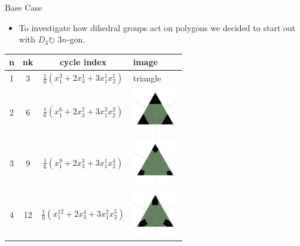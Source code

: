 \documentclass{beamer}
\begin{document}
\begin{frame}{Base Case}
	\begin{itemize}
    	\item To investigate how dihedral groups act on polygons we decided to start out with $D_3  				\circlearrowright$ $3n$-gon.\\
    \end{itemize}
\end{frame}
\begin{frame}
	\begin{table}
	\centering
		\begin{tabular}{c|c|c|l}
			n & nk & cycle index & image\\\hline
			1 & 3 & $\frac{1}{6}\left(x_1^3+2x_3^1+3x_1^1 x_2^1\right)$ & triangle \\\hline
			2 & 6 & $\frac{1}{6}\left(x_1^6+2x_3^2+3x_1^2x_2^2\right)$ & 			\includegraphics[width=2cm]{newtriangle_copya}\\\hline
			3 & 9 & $\frac{1}{6}\left(x_1^9+2x_3^3+3x_1^1x_2^4\right)$ & \includegraphics[width=2cm]{newtriangle_copy9}\\\hline
			4 & 12 & $\frac{1}{6}\left(x_1^{12}+2x_3^4+3x_1^2x_2^5\right)$ & \includegraphics[width=2cm]{newtriangle_copy12}\\\hline
		\end{tabular}
	\end{table}
\end{frame}
\end{document}
